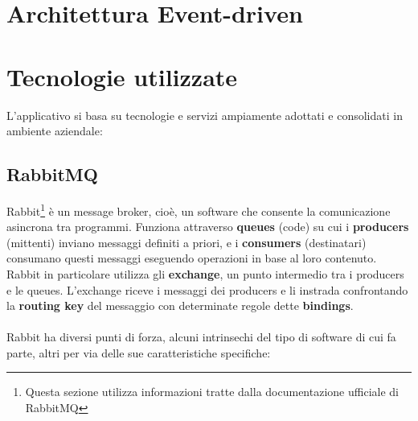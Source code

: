 \section{Architettura Event-driven}

\section{Tecnologie utilizzate}

L'applicativo si basa su tecnologie e servizi ampiamente adottati e consolidati in ambiente aziendale:

\subsection{RabbitMQ}
Rabbit\footnote{Questa sezione utilizza informazioni tratte dalla documentazione ufficiale di RabbitMQ\cite{rabbitmq}}
\`e un message broker, cio\`e, un software che consente la comunicazione asincrona tra programmi.
Funziona attraverso \textbf{queues} (code) su cui i \textbf{producers} (mittenti) inviano messaggi definiti a priori,
e i \textbf{consumers} (destinatari) consumano questi messaggi eseguendo operazioni in base al loro contenuto.
Rabbit in particolare utilizza gli \textbf{exchange}, un punto intermedio tra i producers e le queues.
L'exchange riceve i messaggi dei producers e li instrada confrontando la \textbf{routing key} del messaggio con determinate regole dette \textbf{bindings}.
\\\\
Rabbit ha diversi punti di forza, alcuni intrinsechi del tipo di software di cui fa parte, altri per via delle sue caratteristiche specifiche:\
